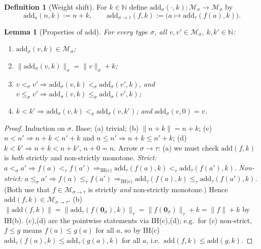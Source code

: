 \documentclass{amsart}
\newtheorem{lemma}{Lemma}
\theoremstyle{definition}
\newtheorem{definition}{Definition}
\begin{document}
\begin{definition}[Weight shift]\label{def:add}
For $k\in\mathbb N$ define $\mathrm{add}_\sigma(\cdot,k):\mathcal M_\sigma\to\mathcal M_\sigma$ by
\[
  \mathrm{add}_o(n,k):=n+k,\qquad
  \mathrm{add}_{\sigma\to\tau}(f,k):=\bigl(a\mapsto\mathrm{add}_\tau(f(a),k)\bigr).
\]
\end{definition}

\begin{lemma}[Properties of $\mathrm{add}$]\label{lem:add}
For every type $\sigma$, all $v,v'\in\mathcal M_\sigma$, $k,k'\in\mathbb N$:
\begin{enumerate}
\item[(a)] $\mathrm{add}_\sigma(v,k)\in\mathcal M_\sigma$;
\item[(b)] $\|\mathrm{add}_\sigma(v,k)\|_\sigma=\|v\|_\sigma+k$;
\item[(c)] $v<_\sigma v'\Rightarrow\mathrm{add}_\sigma(v,k)<_\sigma\mathrm{add}_\sigma(v',k)$,
  and $v\le_\sigma v'\Rightarrow\mathrm{add}_\sigma(v,k)\le_\sigma\mathrm{add}_\sigma(v',k)$;
\item[(d)] $k<k'\Rightarrow\mathrm{add}_\sigma(v,k)<_\sigma\mathrm{add}_\sigma(v,k')$;
  and $\mathrm{add}_\sigma(v,0)=v$.
\end{enumerate}
\end{lemma}

\begin{proof}
Induction on $\sigma$. Base: (a) trivial; (b) $\|n+k\|=n+k$; (c) $n<n'\Rightarrow n+k<n'+k$
and $n\le n'\Rightarrow n+k\le n'+k$; (d) $k<k'\Rightarrow n+k<n+k'$, $n+0=n$.
Arrow $\sigma\to\tau$: (a) we must check $\mathrm{add}(f,k)$ is \emph{both} strictly and
non-strictly monotone. \emph{Strict:}
$a<_\sigma a'\Rightarrow f(a)<_\tau f(a')\Rightarrow_{\text{IH(c)}}
\mathrm{add}_\tau(f(a),k)<_\tau\mathrm{add}_\tau(f(a'),k)$. \emph{Non-strict:}
$a\le_\sigma a'\Rightarrow f(a)\le_\tau f(a')\Rightarrow_{\text{IH(c)}}
\mathrm{add}_\tau(f(a),k)\le_\tau\mathrm{add}_\tau(f(a'),k)$. (Both use that $f\in\mathcal
M_{\sigma\to\tau}$ is strictly \emph{and} non-strictly monotone.) Hence
$\mathrm{add}(f,k)\in\mathcal M_{\sigma\to\tau}$.
(b) $\|\mathrm{add}(f,k)\|=\|\mathrm{add}_\tau(f(\mathbf 0_\sigma),k)\|_\tau=
\|f(\mathbf 0_\sigma)\|_\tau+k=\|f\|+k$ by IH(b). (c),(d) are the pointwise statements via
IH(c),(d); e.g.\ for (c) non-strict, $f\le g$ means $f(a)\le g(a)$ for all $a$, so by IH(c)
$\mathrm{add}_\tau(f(a),k)\le\mathrm{add}_\tau(g(a),k)$ for all $a$, i.e.\
$\mathrm{add}(f,k)\le\mathrm{add}(g,k)$.
\end{proof}
\end{document}
